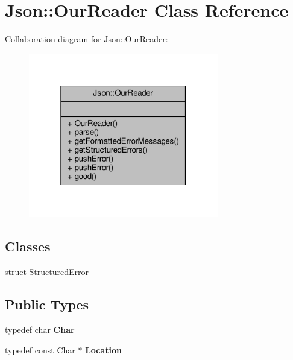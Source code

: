 \hypertarget{classJson_1_1OurReader}{}\section{Json\+:\+:Our\+Reader Class Reference}
\label{classJson_1_1OurReader}


Collaboration diagram for Json\+:\+:Our\+Reader\+:
\nopagebreak
\begin{figure}[H]
\begin{center}
\leavevmode
\includegraphics[width=235pt]{df/d10/classJson_1_1OurReader__coll__graph}
\end{center}
\end{figure}
\subsection*{Classes}
\begin{DoxyCompactItemize}
\item 
struct \hyperlink{structJson_1_1OurReader_1_1StructuredError}{Structured\+Error}
\end{DoxyCompactItemize}
\subsection*{Public Types}
\begin{DoxyCompactItemize}
\item 
typedef char {\bfseries Char}\hypertarget{classJson_1_1OurReader_a0cd0bab4caa66594ab843ccd5f9dc239}{}\label{classJson_1_1OurReader_a0cd0bab4caa66594ab843ccd5f9dc239}

\item 
typedef const Char $\ast$ {\bfseries Location}\hypertarget{classJson_1_1OurReader_a1bdc7bbc52ba87cae6b19746f2ee0189}{}\label{classJson_1_1OurReader_a1bdc7bbc52ba87cae6b19746f2ee0189}

\end{DoxyCompactItemize}
